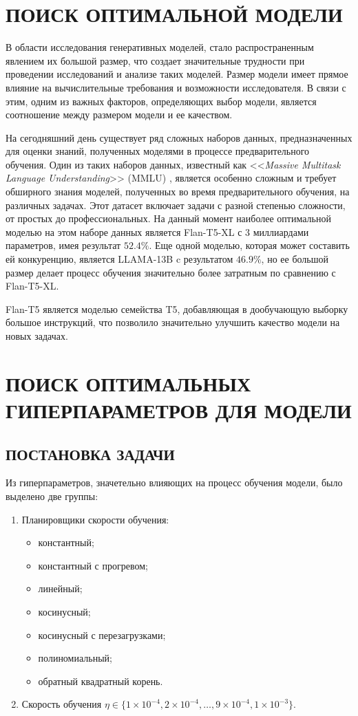 \section{ПОИСК ОПТИМАЛЬНОЙ МОДЕЛИ}
В области исследования генеративных моделей, стало распространенным явлением их большой размер, что создает значительные трудности при проведении исследований и анализе таких моделей. Размер модели имеет прямое влияние на вычислительные требования и возможности исследователя. В связи с этим, одним из важных факторов, определяющих выбор модели, является соотношение между размером модели и ее качеством.

На сегодняшний день существует ряд сложных наборов данных, предназначенных для оценки знаний, полученных моделями в процессе предварительного обучения. Один из таких наборов данных, известный как <<\textit{Massive Multitask Language Understanding}>> (MMLU) \cite{MMLU-bench}, является особенно сложным и требует обширного знания моделей, полученных во время предварительного обучения, на различных задачах. Этот датасет включает задачи с разной степенью сложности, от простых до профессиональных. На данный момент наиболее оптимальной моделью на этом наборе данных является Flan-T5-XL с 3 миллиардами параметров, имея результат $52.4\%$. Еще одной моделью, которая может составить ей конкуренцию, является LLAMA-13B \cite{llama-paper} c результатом $46.9\%$, но ее большой размер делает процесс обучения значительно более затратным по сравнению с Flan-T5-XL.

Flan-T5 является моделью семейства T5, добавляющая в дообучающую выборку большое инструкций, что позволило значительно улучшить качество модели на новых задачах.

\section{ПОИСК ОПТИМАЛЬНЫХ ГИПЕРПАРАМЕТРОВ ДЛЯ МОДЕЛИ}
\subsection{ПОСТАНОВКА ЗАДАЧИ}

Из гиперпараметров, значетельно влияющих на процесс обучения модели, было выделено две группы:
\begin{enumerate}
  \item Планировщики скорости обучения:
        \begin{itemize}
          \item константный;
          \item константный с прогревом;
          \item линейный;
          \item косинусный;
          \item косинусный с перезагрузками;
          \item полиномиальный;
          \item обратный квадратный корень.
        \end{itemize}
  \item Скорость обучения $\eta \in \{1 \times 10^{-4}, 2 \times 10^{-4}, \ldots, 9 \times 10^{-4}, 1 \times 10^{-3}\}$.
\end{enumerate}


